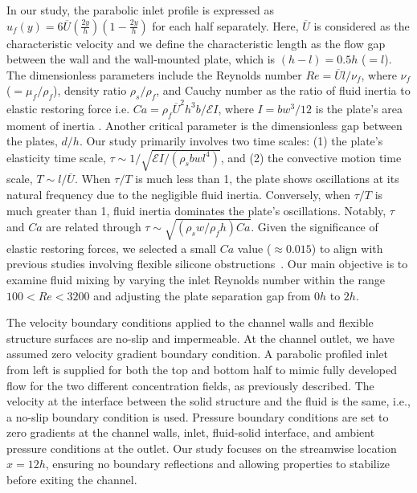 \documentclass[reprint,a4paper,fleqn]{cas-dc} %
\begin{document}
		
		In our study, the parabolic inlet profile is expressed as $u_f(y)=6\overline{U}\left(\frac{2y}{h}\right)\left(1-\frac{2y}{h}\right)$ for each half separately. Here, $\overline{U}$ is considered as the characteristic velocity and we define the characteristic length as the flow gap between the wall and the wall-mounted plate, which is $(h - l) = 0.5h$ ($= l$). The dimensionless parameters include the Reynolds number $Re=\overline{U}l/\nu_f$, where $\nu_f$ ($=\mu_f/\rho_f$), density ratio $\rho_s/\rho_f$, and Cauchy number as the ratio of fluid inertia to elastic restoring force i.e. $Ca=\rho_f \overline{U}^2 h^3 b/{\mathcal{E}I}$, where $I=bw^3/12$ is the plate's area moment of inertia \citep{Bhageri2012,Pinelli2015}. Another critical parameter is the dimensionless gap between the plates, $d/h$. Our study primarily involves two time scales: (1) the plate's elasticity time scale, $\tau \sim{1/\sqrt{\mathcal{E}I/(\rho_s bwl^4)}}$, and (2) the convective motion time scale, $T \sim l/ \overline{U}$. When $\tau/T$ is much less than 1, the plate shows oscillations at its natural frequency due to the negligible fluid inertia. Conversely, when $\tau/T$ is much greater than 1, fluid inertia dominates the plate's oscillations. Notably, $\tau$ and $Ca$ are related through $\tau \sim \sqrt{\left({\rho_s w/\rho_f h}\right)Ca}$. Given the significance of elastic restoring forces, we selected a small $Ca$ value ($\approx 0.015$) to align with previous studies involving flexible silicone obstructions~\citep{Vandenberghe2004, Self2019}. Our main objective is to examine fluid mixing by varying the inlet Reynolds number within the range $100 < Re < 3200$ and adjusting the plate separation gap from $0h$ to $2h$.
		
		The velocity boundary conditions applied to the channel walls and flexible structure surfaces are no-slip and impermeable. At the channel outlet, we have assumed zero velocity gradient boundary condition. A parabolic profiled inlet from left is supplied for both the top and bottom half to mimic fully developed flow for the two different concentration fields, as previously described. The velocity at the interface between the solid structure and the fluid is the same, i.e., a no-slip boundary condition is used. Pressure boundary conditions are set to zero gradients at the channel walls, inlet, fluid-solid interface, and ambient pressure conditions at the outlet. Our study focuses on the streamwise location $x=12h$, ensuring no boundary reflections and allowing properties to stabilize before exiting the channel.
		
\end{document}
